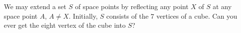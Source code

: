 We may extend a set $S$ of space points by reflecting any point $X$ of $S$ at any space point $A$, $A \neq X$. Initially, $S$ consists of the $7$ vertices of a cube. Can you ever get the eight vertex of the cube into $S$?
